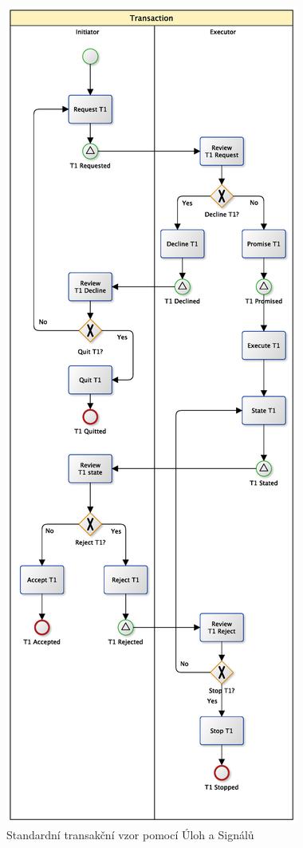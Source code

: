 \documentclass[]{article}
\begin{document}
\begin{figure}[H]\centering
\includegraphics[width=\textwidth,height=\textheight,keepaspectratio]{obrazky/transaction-standard-signals}
\caption{Standardní transakční vzor pomocí Úloh a Signálů}
\label{fig:St_trans_ulohy_signaly}
\end{figure}
\end{document}
